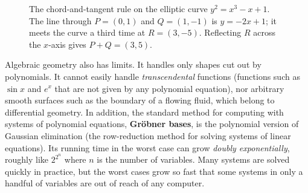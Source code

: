\begin{figure}[htbp]
\centering
{}
\caption{The chord-and-tangent rule on the elliptic curve $y^2 = x^3 - x + 1$. The line through $P = (0, 1)$ and $Q = (1, -1)$ is $y = -2x + 1$; it meets the curve a third time at $R = (3, -5)$. Reflecting $R$ across the $x$-axis gives $P + Q = (3, 5)$.}
\label{24:fig-chord-tangent}
\end{figure}

Algebraic geometry also has limits. It handles only shapes cut out by polynomials. It cannot easily handle \emph{transcendental} functions (functions such as $\sin x$ and $e^x$ that are not given by any polynomial equation), nor arbitrary smooth surfaces such as the boundary of a flowing fluid, which belong to differential geometry. In addition, the standard method for computing with systems of polynomial equations, \textbf{Gr\"obner bases}, is the polynomial version of Gaussian elimination (the row-reduction method for solving systems of linear equations). Its running time in the worst case can grow \emph{doubly exponentially}, roughly like $2^{2^n}$ where $n$ is the number of variables. Many systems are solved quickly in practice, but the worst cases grow so fast that some systems in only a handful of variables are out of reach of any computer.

